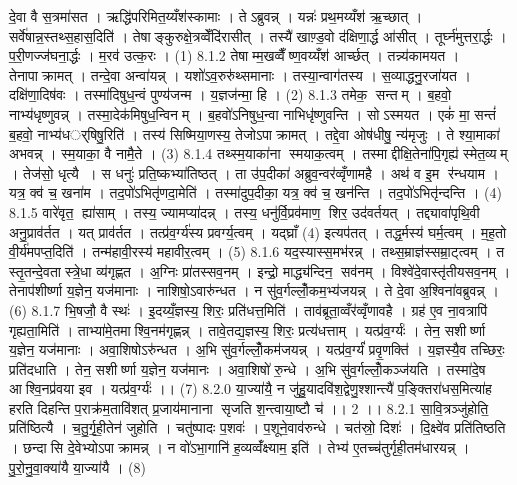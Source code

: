 दे॒वा वै स॒त्रमा॑सत । ऋद्धि॑परिमित॒य्यँश॑स्कामाः । तेऽब्रुवन्न् । यन्नः॑ प्रथ॒मय्यँश॑ ऋ॒च्छात् । सर्वे॑षान्न॒स्तथ्स॒हास॒दिति॑ । तेषाङ्कुरुक्षे॒त्रव्वेँदि॑रासीत् । तस्यै॑ खाण़्ड॒वो द॑क्षिणा॒र्द्ध आ॑सीत् । तूर्घ्न॑मुत्तरा॒र्द्धः । प॒री॒णज्ज॑घना॒र्द्धः । म॒रव॑ उत्क॒रः । (1)
8.1.2
तेषाम्म॒खव्वैँष्ण॒वय्यँश॑ आर्च्छत् । तन्न्य॑कामयत । तेनापाक्रामत् । तन्दे॒वा अन्वा॑यन्न् । यशो॑ऽव॒रुरु॑थ्समानाः । तस्या॒न्वाग॑तस्य । स॒व्याद्धनु॒रजा॑यत । दक्षि॑णा॒दिष॑वः । तस्मा॑दिषुध॒न्वं पुण्य॑जन्म । य॒ज्ञज॑न्मा॒ हि । (2)
8.1.3
तमेक॒॒ सन्तम् । ब॒हवो॒ नाभ्य॑धृष्णुवन्न् । तस्मा॒देक॑मिषुध॒न्विनम् । ब॒हवो॑ऽनिषुध॒न्वा नाभिधृ॑ष्णुवन्ति । सोऽस्मयत । एकं॑ मा॒ सन्तं॑ ब॒हवो॒ नाभ्य॑धर््षिषु॒रिति॑ । तस्य॑ सिष्मिया॒णस्य॒ तेजोऽपाक्रामत् । तद्दे॒वा ओष॑धीषु॒ न्य॑मृजुः । ते श्या॒माका॑ अभवन्न् । स्म॒याका॒ वै नामै॒ते । (3)
8.1.4
तथ्स्म॒याका॑ना स्मयाक॒त्वम् । तस्माद्दीक्षि॒तेना॑पि॒गृह्य॑ स्मेत॒व्यम् । तेज॑सो॒ धृत्यै । स धनुः॑ प्रति॒ष्कभ्या॑तिष्ठत् । ता उ॑प॒दीका॑ अब्रुव॒न्वर॑व्वृँणामहै । अथ॑ व इ॒म र॑न्धयाम । यत्र॒ क्व॑ च॒ खना॑म । तद॒पो॑ऽभितृ॑णदा॒मेति॑ । तस्मा॑दुप॒दीका॒ यत्र॒ क्व॑ च॒ खन॑न्ति । तद॒पो॑ऽभितृ॑न्दन्ति । (4)
8.1.5
वारे॑वृत॒॒ ह्या॑साम् । तस्य॒ ज्यामप्या॑दन्न् । तस्य॒ धनु॑र्वि॒प्रव॑माण॒॒ शिर॒ उद॑वर्तयत् । तद्द्यावा॑पृथि॒वी अनु॒प्राव॑र्तत । यत् प्राव॑र्तत । तत्प्र॑व॒र्ग्य॑स्य प्रवर्ग्य॒त्वम् । यद्घ्राँ (4) इत्यप॑तत् । तद्ध॒र्मस्य॑ घर्म॒त्वम् । म॒ह॒तो वी॒र्य॑मपप्त॒दिति॑ । तन्म॑हावी॒रस्य॑ महावीर॒त्वम् । (5)
8.1.6
यद॒स्यास्स॒मभ॑रन्न् । तथ्स॒म्राज्ञ॑स्सम्रा॒ट्त्वम् । त स्तृ॒तन्दे॒वतास्त्रे॒धा व्य॑गृह्णत । अ॒ग्निः प्रा॑तस्सव॒नम् । इन्द्रो॒ माद्ध्य॑न्दिन॒॒ सव॑नम् । विश्वे॑दे॒वास्तृ॑तीयसव॒नम् । तेनाप॑शीर्ष्णा य॒ज्ञेन॒ यज॑मानाः । नाशिषो॒ऽवारु॑न्धत । न सु॑व॒र्गल्लोँ॒कम॒भ्य॑जयन्न् । ते दे॒वा अ॒श्विना॑वब्रुवन्न् । (6)
8.1.7
भि॒षजौ॒ वै स्थः॑ । इ॒दय्यँ॒ज्ञस्य॒ शिरः॒ प्रति॑धत्त॒मिति॑ । ताव॑ब्रूता॒व्वँर॑व्वृँणावहै । ग्रह॑ ए॒व ना॒वत्रापि॑ गृह्यता॒मिति॑ । ताभ्या॑मे॒तमाश्वि॒नम॑गृह्णन्न् । तावे॒तद्य॒ज्ञस्य॒ शिरः॒ प्रत्य॑धत्ताम् । यत्प्र॑व॒र्ग्यः॑ । तेन॒ सशीर्ष्णा य॒ज्ञेन॒ यज॑मानाः । अवा॒शिषोऽरु॑न्धत । अ॒भि सु॑व॒र्गल्लोँ॒कम॑जयन्न् । यत्प्र॑व॒र्ग्यं॑ प्रवृ॒णक्ति॑ । य॒ज्ञस्यै॒व तच्छिरः॒ प्रति॑दधाति । तेन॒ सशीर्ष्णा य॒ज्ञेन॒ यज॑मानः । अवा॒शिषो॑ रु॒न्धे । अ॒भि सु॑व॒र्गल्लोँ॒कञ्ज॑यति । तस्मा॑दे॒ष आश्वि॒नप्र॑वया इव । यत्प्र॑व॒र्ग्यः॑ ।। (7)
8.2.0
या॒ज्या॑यै॒ न जु॑हु॒यादवि॑श॒द्वेणु॒श्शान्त्यै॑ प॒ङ्क्तिरा॑धस॒मित्या॑ह हरति दिहन्ति प॒राक्र॑म॒तावि॑शत् प्र॒जाय॑मानाना सृजति श॒न्त्वाया॒ष्टौ च॑ ।। 2 ।।
8.2.1
सा॒वि॒त्रञ्जु॑होति॒ प्रति॑ष्ठित्यै । च॒तु॒र्गृ॒ही॒तेन॑ जुहोति । चतु॑ष्पादः प॒शवः॑ । प॒शूने॒वाव॑रुन्धे । चत॑स्रो॒ दिशः॑ । दि॒क्ष्वे॑व प्रति॑तिष्ठति । छन्दा॑सि दे॒वेभ्योऽपाक्रामन्न् । न वो॑ऽभा॒गानि॑ ह॒व्यव्वँ॑क्ष्याम॒ इति॑ । तेभ्य॑ ए॒तच्च॑तुर्गृही॒तम॑धारयन्न् । पु॒रो॒नु॒वा॒क्या॑यै या॒ज्या॑यै । (8)
